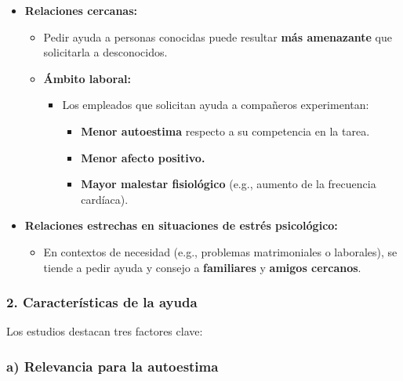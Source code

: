 \documentclass[
]{book}
\providecommand{\tightlist}{%
  \setlength{\itemsep}{0pt}\setlength{\parskip}{0pt}}
\begin{document}
\begin{itemize}
\tightlist
\item
  \textbf{Relaciones cercanas:}

  \begin{itemize}
  \tightlist
  \item
    Pedir ayuda a personas conocidas puede resultar \textbf{más amenazante} que solicitarla a desconocidos.
  \item
    \textbf{Ámbito laboral:}

    \begin{itemize}
    \tightlist
    \item
      Los empleados que solicitan ayuda a compañeros experimentan:

      \begin{itemize}
      \tightlist
      \item
        \textbf{Menor autoestima} respecto a su competencia en la tarea.\\
      \item
        \textbf{Menor afecto positivo.}\\
      \item
        \textbf{Mayor malestar fisiológico} (e.g., aumento de la frecuencia cardíaca).
      \end{itemize}
    \end{itemize}
  \end{itemize}
\item
  \textbf{Relaciones estrechas en situaciones de estrés psicológico:}

  \begin{itemize}
  \tightlist
  \item
    En contextos de necesidad (e.g., problemas matrimoniales o laborales), se tiende a pedir ayuda y consejo a \textbf{familiares} y \textbf{amigos cercanos}.
  \end{itemize}
\end{itemize}

\subsubsection{\texorpdfstring{2. \textbf{Características de la ayuda}}{2. Características de la ayuda}}\label{caracteruxedsticas-de-la-ayuda}

Los estudios destacan tres factores clave:

\subsubsection{\texorpdfstring{\textbf{a) Relevancia para la autoestima}}{a) Relevancia para la autoestima}}\label{a-relevancia-para-la-autoestima}
\end{document}
